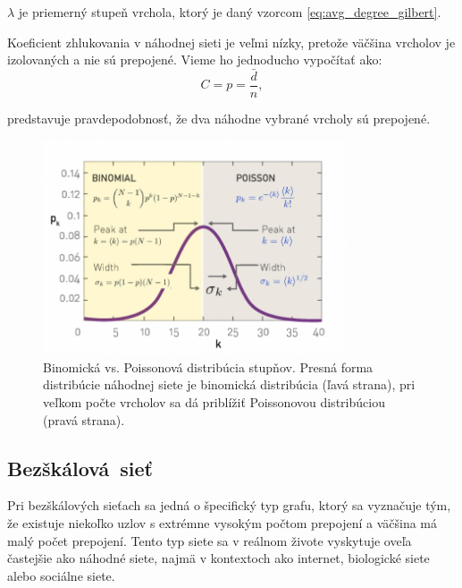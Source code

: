 $\lambda$ je priemerný stupeň vrchola, ktorý je daný vzorcom \ref{eq:avg_degree_gilbert}.

Koeficient zhlukovania v náhodnej sieti je veľmi nízky, pretože väčšina vrcholov je izolovaných a nie sú prepojené.
Vieme ho jednoducho vypočítať ako:
\begin{equation}
    C = p = \frac{\bar{d}}{n},
    \label{eq:clustering_coefficient_random}
\end{equation}

predstavuje pravdepodobnosť, že dva náhodne vybrané vrcholy sú prepojené\cite{barabasi2016network}.

\clearpage

\begin{figure}
    \centerline{\includegraphics[width=0.8\textwidth]{images/randomdegdist.png}}
    \caption[Binomická vs. Poissonová distribúcia stupňov.]{Binomická vs. Poissonová distribúcia stupňov.
    Presná forma distribúcie náhodnej siete je binomická distribúcia (ľavá strana), pri veľkom počte vrcholov sa
    dá priblížiť Poissonovou distribúciou (pravá strana)\cite{barabasi2016network}.}
    \label{obr:randomdegdist}
\end{figure}

\subsection{Bezškálová~sieť}\label{sec:scale-free-network}

Pri bezškálových sieťach sa jedná o špecifický typ grafu, ktorý sa vyznačuje tým, že existuje niekoľko uzlov
s extrémne vysokým počtom prepojení a väčšina má malý počet prepojení. Tento typ siete sa
v reálnom živote vyskytuje oveľa častejšie ako náhodné siete, najmä v kontextoch ako internet,
biologické siete alebo sociálne siete\cite{barabasi1999emergence}\cite{barabasi2016network}.


